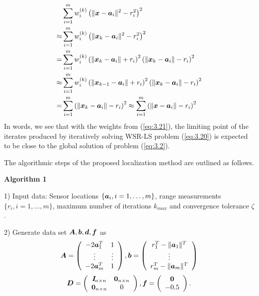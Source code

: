 \begin{equation} \label{sr:w}
\nonumber
\begin{aligned}
&\sum_{i=1}^m w_i^{(k)}\left(\|\mbox{\boldmath$x$}-\mbox{\boldmath$a$}_i\|^2-r_i^2\right)^2 \\
 \approx &\sum_{i=1}^m w_i^{(k)}\left(\|\mbox{\boldmath$x$}_k-\mbox{\boldmath$a$}_i\|^2-r_i^2\right)^2 \\
 =&\sum_{i=1}^m w_i^{(k)}\left(\|\mbox{\boldmath$x$}_k-\mbox{\boldmath$a$}_i\|+r_i\right)^2\left(\|\mbox{\boldmath$x$}_k-\mbox{\boldmath$a$}_i\|-r_i\right)^2  \\
 \approx &\sum_{i=1}^m w_i^{(k)}\left(\|\mbox{\boldmath$x$}_{k-1}-\mbox{\boldmath$a$}_i\|+r_i\right)^2\left(\|\mbox{\boldmath$x$}_k-\mbox{\boldmath$a$}_i\|-r_i\right)^2 \\
 =&\sum_{i=1}^m \left(\|\mbox{\boldmath$x$}_k-\mbox{\boldmath$a$}_i\|-r_i\right)^2 \approx \sum_{i=1}^m \left(\|\mbox{\boldmath$x$}-\mbox{\boldmath$a$}_i\|-r_i\right)^2\\
\end{aligned}
\end{equation}
In words, we see that with the weights from (\ref{eq:3.21}), the limiting point of the iterates produced by iteratively solving WSR-LS problem (\ref{eq:3.20}) is expected to be close to the global solution of problem (\ref{eq:3.2}).

The algorithmic steps of the proposed localization method are outlined as follows.

\noindent \textbf{Algorithm 1} \label{alg:r-ls}

1) Input data: Sensor locations $\{\mbox{\boldmath$a$}_i, i=1,\ldots,m\}$, range measurements $\{r_i, i=1,\ldots,m\}$, maximum number of iterations $k_{max}$ and convergence tolerance $\zeta$.

2) Generate data set $\mbox{\boldmath$A$},\mbox{\boldmath$b$}, \mbox{\boldmath$d$}, \mbox{\boldmath$f$}$ as
\begin{equation} 
\nonumber
\mbox{\boldmath$A$}=\left(\begin{array}{cc}
    -2\mbox{\boldmath$a$}_1^T & 1 \\
    \vdots  & \vdots \\
    -2\mbox{\boldmath$a$}_m^T & 1
    \end{array} \right),
\mbox{\boldmath$b$}=\left(\begin{array}{c}
    r_1^T-\|\mbox{\boldmath$a$}_1\|^T \\
    \vdots \\
    r_m^T-\|\mbox{\boldmath$a$}_m\|^T
    \end{array} \right)
\end{equation}
\begin{equation} 
\nonumber
\mbox{\boldmath$D$}=\left(\begin{array}{cc}
    \mbox{\boldmath$I$}\!_{n\times n} & \mbox{\boldmath{$0$}}_{n\times n} \\
    \mbox{\boldmath{$0$}}_{n\times n} & 0
    \end{array} \right),
\mbox{\boldmath$f$}=\left(\begin{array}{c}\mbox{\boldmath{$0$}} \\ -0.5 \end{array} \right) .
\end{equation}

